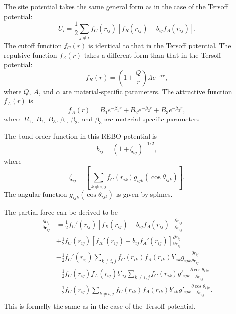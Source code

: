 \documentclass[12pt,a4paper]{report}
\newcommand{\vect}[1]{\boldsymbol{#1}}
\begin{document}
The site potential takes the same general form as in the case of the Tersoff potential:
\begin{equation}
U_i =  \frac{1}{2} \sum_{j \neq i} f_C(r_{ij}) \left[ f_R(r_{ij}) - b_{ij} f_A(r_{ij}) \right].
\end{equation}
The cutoff function $f_{C}(r)$ is identical to that in the Tersoff potential. The repulsive function $f_{R}(r)$ takes a different form than that in the Tersoff potential:
\begin{equation}
f_{R}(r) = \left(1+\frac{Q}{r}\right) A e^{-\alpha r},
\end{equation}
where $Q$, $A$, and $\alpha$ are material-specific parameters. The attractive function $f_{A}(r)$ is
\begin{equation}
f_{A}(r) = B_1 e^{-\beta_1 r} + B_2 e^{-\beta_2 r} + B_3 e^{-\beta_3 r},
\end{equation}
where $B_1$, $B_2$, $B_3$, $\beta_1$, $\beta_2$, and $\beta_3$ are material-specific parameters.

The bond order function in this REBO potential is
\begin{equation}
b_{ij} =\left(1 + \zeta_{ij}\right)^{-1/2},
\end{equation}
where
\begin{equation}
\zeta_{ij} = \left[ \sum_{k\neq i, j} f_C(r_{ik}) g_{ijk}(\cos\theta_{ijk}) \right].
\end{equation}
The angular function  $g_{ijk}(\cos\theta_{ijk})$ is given by splines.

The partial force can be derived to be
\begin{align}
\frac{\partial U_i}{\partial \vect{r}_{ij}}
&= \frac{1}{2}f_C'(r_{ij})[f_R(r_{ij})-b_{ij}f_A(r_{ij})]\frac{\partial r_{ij}}{\partial \vect{r}_{ij}} \nonumber \\
&+ \frac{1}{2}f_C(r_{ij})[f_R'(r_{ij})-b_{ij}f_A'(r_{ij})]\frac{\partial r_{ij}}{\partial \vect{r}_{ij}} \nonumber \\
&- \frac{1}{2}f_C'(r_{ij})\sum_{k\neq i,j}f_C(r_{ik})f_A(r_{ik})b'_{ik}g_{ijk} \frac{\partial r_{ij}}{\partial \vect{r}_{ij}} \nonumber \\
&- \frac{1}{2}f_C(r_{ij})f_A(r_{ij})b'_{ij}\sum_{k\neq i,j}f_C(r_{ik})  g'_{ijk}
   \frac{\partial \cos\theta_{ijk}}{\partial \vect{r}_{ij}} \nonumber \\
&- \frac{1}{2}f_C(r_{ij})\sum_{k\neq i,j}f_C(r_{ik})f_A(r_{ik})b'_{ik}  g'_{ijk}
   \frac{\partial \cos\theta_{ijk}}{\partial \vect{r}_{ij}}. \nonumber \\
\end{align}
This is formally the same as in the case of the Tersoff potential.
\end{document}
